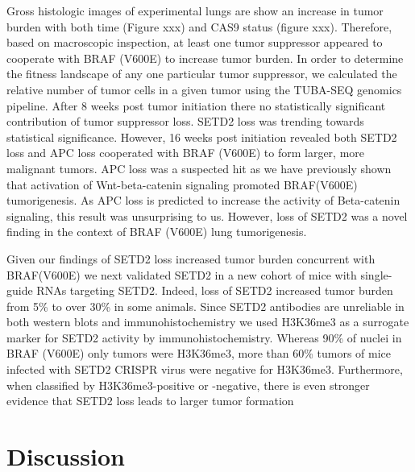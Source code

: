 Gross histologic images of experimental lungs are show an increase in tumor burden with both time (Figure xxx) and CAS9 status (figure xxx). Therefore, based on macroscopic inspection, at least one tumor suppressor appeared to cooperate with BRAF (V600E) to increase tumor burden. In order to determine the fitness landscape of any one particular tumor suppressor, we calculated the relative number of tumor cells in a given tumor using the TUBA-SEQ genomics pipeline. After 8 weeks post tumor initiation there no statistically significant contribution of tumor suppressor loss. SETD2 loss was trending towards statistical significance. However, 16 weeks post initiation revealed both SETD2 loss and APC loss cooperated with BRAF (V600E) to form larger, more malignant tumors. APC loss was a suspected hit as we have previously shown that activation of Wnt-beta-catenin signaling promoted BRAF(V600E) tumorigenesis. As APC loss is predicted to increase the activity of Beta-catenin signaling, this result was unsurprising to us. However, loss of SETD2 was a novel finding in the context of BRAF (V600E) lung tumorigenesis.

Given our findings of SETD2 loss increased tumor burden concurrent with BRAF(V600E) we next validated SETD2 in a new cohort of mice with single-guide RNAs targeting SETD2. Indeed, loss of SETD2 increased tumor burden from 5\% to over 30\% in some animals. Since SETD2 antibodies are unreliable in both western blots and immunohistochemistry we used H3K36me3 as a surrogate marker for SETD2 activity by immunohistochemistry. Whereas 90\% of nuclei in BRAF (V600E) only tumors were H3K36me3, more than 60\% tumors of mice infected with SETD2 CRISPR virus were negative for H3K36me3. Furthermore, when classified by H3K36me3-positive or -negative, there is even stronger evidence that SETD2 loss leads to larger tumor formation

\hypertarget{discussion}{%
\section{Discussion}\label{discussion}}

